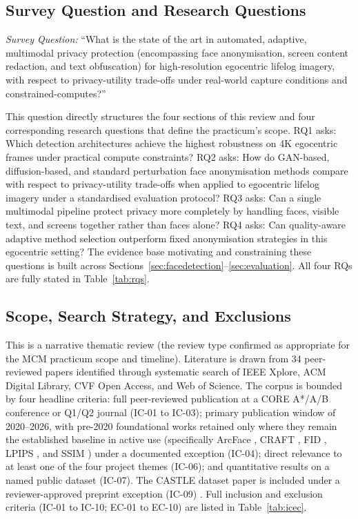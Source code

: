 \documentclass[12pt, onecolumn]{IEEEtran}
\begin{document}
\subsection{Survey Question and Research Questions}

\textit{Survey Question:} ``What is the state of the art in automated, adaptive,
multimodal privacy protection (encompassing face anonymisation, screen content redaction, and text
obfuscation) for high-resolution egocentric lifelog imagery, with respect to privacy-utility trade-offs
under real-world capture conditions and constrained-computes?''

This question directly structures the four sections of this review and four corresponding research questions
that define the practicum's scope. RQ1 asks: Which detection architectures achieve the highest robustness on 4K egocentric frames under practical compute constraints? RQ2 asks: How do GAN-based, diffusion-based, and standard perturbation face anonymisation methods compare with respect to privacy-utility trade-offs when applied to egocentric lifelog imagery under a standardised evaluation protocol? RQ3 asks: Can a single multimodal pipeline protect privacy more completely by handling faces, visible text, and screens together rather than faces alone? RQ4 asks: Can quality-aware adaptive method selection outperform fixed anonymisation strategies in this egocentric setting? The evidence base motivating and constraining these questions is built across Sections~\ref{sec:facedetection}--\ref{sec:evaluation}. All four RQs are fully stated in Table~\ref{tab:rqs}.

\subsection{Scope, Search Strategy, and Exclusions}

This is a narrative thematic review (the review type confirmed as appropriate for the MCM practicum scope
and timeline). Literature is drawn from 34 peer-reviewed papers identified through systematic search of IEEE
Xplore, ACM Digital Library, CVF Open Access, and Web of Science. The corpus is bounded by four headline
criteria: full peer-reviewed publication at a CORE A*/A/B conference or Q1/Q2 journal (IC-01 to IC-03);
primary publication window of 2020--2026, with pre-2020 foundational works retained only where they remain
the established baseline in active use (specifically ArcFace \cite{deng2019arcface}, CRAFT \cite{baek2019craft}, FID \cite{heusel2017fid}, LPIPS \cite{zhang2018lpips}, and
SSIM \cite{wang2004ssim}) under a documented exception (IC-04); direct relevance to at least one of the four project
themes (IC-06); and quantitative results on a named public dataset (IC-07). The CASTLE dataset paper is
included under a reviewer-approved preprint exception (IC-09) \cite{rossetto2025castle}. Full inclusion and exclusion criteria
(IC-01 to IC-10; EC-01 to EC-10) are listed in Table~\ref{tab:icec}.
\end{document}

